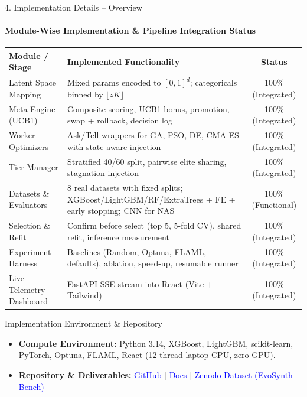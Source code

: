 \documentclass[aspectratio=169, 11pt]{beamer}
\begin{document}
\begin{frame}{4. Implementation Details -- Overview}
    \framesubtitle{Module-Wise Implementation \& Pipeline Integration Status}
    \vspace{-0.15cm}
    \begin{table}
        \centering
        \tiny
        \renewcommand{\arraystretch}{1.1}
        \begin{tabular}{p{3.2cm} p{7.4cm} c}
            \toprule
            \textbf{Module / Stage} & \textbf{Implemented Functionality} & \textbf{Status} \\
            \midrule
            Latent Space Mapping & Mixed params encoded to $[0,1]^d$; categoricals binned by $\lfloor zK\rfloor$ & 100\% (Integrated) \\
            Meta-Engine (UCB1) & Composite scoring, UCB1 bonus, promotion, swap + rollback, decision log & 100\% (Integrated) \\
            Worker Optimizers & Ask/Tell wrappers for GA, PSO, DE, CMA-ES with state-aware injection & 100\% (Integrated) \\
            Tier Manager & Stratified 40/60 split, pairwise elite sharing, stagnation injection & 100\% (Integrated) \\
            Datasets \& Evaluators & 8 real datasets with fixed splits; XGBoost/LightGBM/RF/ExtraTrees + FE + early stopping; CNN for NAS & 100\% (Functional) \\
            Selection \& Refit & Confirm before select (top 5, 5-fold CV), shared refit, inference measurement & 100\% (Integrated) \\
            Experiment Harness & Baselines (Random, Optuna, FLAML, defaults), ablation, speed-up, resumable runner & 100\% (Integrated) \\
            Live Telemetry Dashboard & FastAPI SSE stream into React (Vite + Tailwind) & 100\% (Integrated) \\
            \bottomrule
        \end{tabular}
    \end{table}
    \vspace{-0.2cm}

    \begin{block}{Implementation Environment \& Repository}
        \scriptsize
        \begin{itemize}
            \setlength{\itemsep}{1pt}
            \item \textbf{Compute Environment:} Python 3.14, XGBoost, LightGBM, scikit-learn, PyTorch, Optuna, FLAML, React (12-thread laptop CPU, zero GPU).
            \item \textbf{Repository \& Deliverables:} \href{https://github.com/paarthureddy/EvoSynth}{\textcolor{blue}{GitHub}} \quad | \quad \href{https://evosynth-2027.github.io/evosynth-docs/}{\textcolor{blue}{Docs}} \quad | \quad \href{https://doi.org/10.5281/zenodo.23645119}{\textcolor{blue}{Zenodo Dataset (EvoSynth-Bench)}}
        \end{itemize}
    \end{block}
\end{frame}
\end{document}
